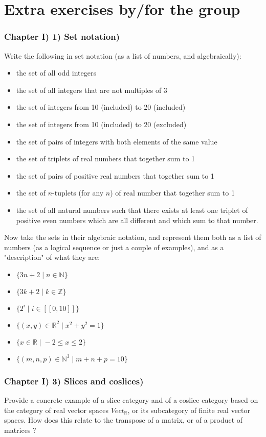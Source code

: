 \documentclass[12pt, letterpaper, twoside]{report}
\begin{document}
\part{Extra exercises by/for the group}

\section*{Chapter I) 1) Set notation)}

Write the following in set notation (as a list of numbers, and algebraically):
\begin{itemize}
	\item the set of all odd integers
	\item the set of all integers that are not multiples of 3
	\item the set of integers from 10 (included) to 20 (included)
	\item the set of integers from 10 (included) to 20 (excluded)
	\item the set of pairs of integers with both elements of the same value
	\item the set of triplets of real numbers that together sum to 1
	\item the set of pairs of positive real numbers that together sum to 1
	\item the set of $n$-tuplets (for any $n$) of real number that together sum to 1
	\item the set of all natural numbers such that there exists at least one triplet of positive even numbers which are all different and which sum to that number.
\end{itemize}

Now take the sets in their algebraic notation, and represent them both as a list of numbers (as a logical sequence or just a couple of examples), and as a "description" of what they are:

\begin{itemize}
	\item $\{3n + 2 \; | \; n \in \mathbb{N} \}$
	\item $\{3k + 2 \; | \; k \in \mathbb{Z} \}$
	\item $\{ 2^i \; | \; i \in [[0, 10]] \}$
	\item $\{ (x, y) \in \mathbb{R}^2 \; | \; x^2 + y^2 = 1 \}$
	\item $\{ x \in \mathbb{R} \; | \; -2 \leq x \leq 2 \}$
	\item $\{ (m, n, p) \in \mathbb{N}^3 \; | \; m + n + p = 10 \}$
\end{itemize}



\section*{Chapter I) 3) Slices and coslices)}

Provide a concrete example of a slice category and of a coslice category based on the category of real vector spaces $Vect_{\mathbb{R}}$, or its subcategory of finite real vector spaces.
How does this relate to the transpose of a matrix, or of a product of matrices ?

\newpage
\end{document}
